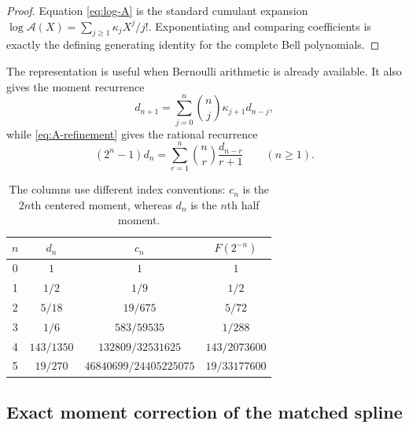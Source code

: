 \documentclass[11pt,oneside]{article}
\theoremstyle{definition}
\theoremstyle{remark}
\begin{document}
\begin{proof}
Equation \eqref{eq:log-A} is the standard cumulant expansion
$\log\mathscr A(X)=\sum_{j\ge1}\kappa_jX^j/j!$.  Exponentiating and comparing coefficients
is exactly the defining generating identity for the complete Bell polynomials.
\end{proof}

The representation is useful when Bernoulli arithmetic is already available.  It also gives
the moment recurrence
\begin{equation}
 d_{n+1}=\sum_{j=0}^{n}\binom nj\kappa_{j+1}d_{n-j},       \label{eq:cumulant-moment-recurrence}
\end{equation}
while \eqref{eq:A-refinement} gives the rational recurrence
\begin{equation}
 (2^n-1)d_n
 =\sum_{r=1}^{n}\binom nr\frac{d_{n-r}}{r+1}
 \qquad(n\ge1).                                           \label{eq:d-recurrence-companion}
\end{equation}

\begin{table}[ht]
\centering
\small
\begin{tabular}{@{}c c c c@{}}
\toprule
$n$ & $d_n$ & $c_n$ & $F(2^{-n})$ \\
\midrule
0 & $1$ & $1$ & $1$ \\
1 & $1/2$ & $1/9$ & $1/2$ \\
2 & $5/18$ & $19/675$ & $5/72$ \\
3 & $1/6$ & $583/59535$ & $1/288$ \\
4 & $143/1350$ & $132809/32531625$ & $143/2073600$ \\
5 & $19/270$ & $46840699/24405225075$ & $19/33177600$ \\
\bottomrule
\end{tabular}
\caption{The columns use different index conventions: $c_n$ is the $2n$th centered moment,
whereas $d_n$ is the $n$th half moment.}
\label{tab:moments}
\end{table}

\subsection{Exact moment correction of the matched spline}
\label{subsec:moment-corrected-spline}
\end{document}
